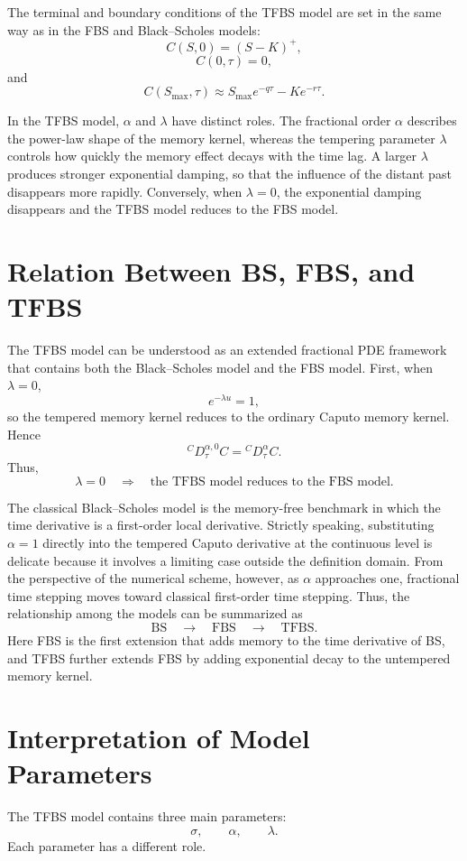 \documentclass[11pt,a4paper]{report}
\begin{document}
The terminal and boundary conditions of the TFBS model are set in the same way as in the FBS and Black--Scholes models:
\[
C(S,0)
=
(S-K)^+,
\]
\[
C(0,\tau)=0,
\]
and
\[
C(S_{\max},\tau)
\approx
S_{\max}e^{-q\tau}
-
Ke^{-r\tau}.
\]

In the TFBS model, $\alpha$ and $\lambda$ have distinct roles. The fractional order $\alpha$ describes the power-law shape of the memory kernel, whereas the tempering parameter $\lambda$ controls how quickly the memory effect decays with the time lag. A larger $\lambda$ produces stronger exponential damping, so that the influence of the distant past disappears more rapidly. Conversely, when $\lambda=0$, the exponential damping disappears and the TFBS model reduces to the FBS model.

\section{Relation Between BS, FBS, and TFBS}

The TFBS model can be understood as an extended fractional PDE framework that contains both the Black--Scholes model and the FBS model. First, when $\lambda=0$,
\[
e^{-\lambda u}=1,
\]
so the tempered memory kernel reduces to the ordinary Caputo memory kernel. Hence
\[
{}^C D_\tau^{\alpha,0}C
=
{}^C D_\tau^\alpha C.
\]
Thus,
\[
\lambda=0
\quad\Longrightarrow\quad
\text{the TFBS model reduces to the FBS model.}
\]

The classical Black--Scholes model is the memory-free benchmark in which the time derivative is a first-order local derivative. Strictly speaking, substituting $\alpha=1$ directly into the tempered Caputo derivative at the continuous level is delicate because it involves a limiting case outside the definition domain. From the perspective of the numerical scheme, however, as $\alpha$ approaches one, fractional time stepping moves toward classical first-order time stepping. Thus, the relationship among the models can be summarized as
\[
\text{BS}
\quad\longrightarrow\quad
\text{FBS}
\quad\longrightarrow\quad
\text{TFBS}.
\]
Here FBS is the first extension that adds memory to the time derivative of BS, and TFBS further extends FBS by adding exponential decay to the untempered memory kernel.

\section{Interpretation of Model Parameters}

The TFBS model contains three main parameters:
\[
\sigma,
\qquad
\alpha,
\qquad
\lambda.
\]
Each parameter has a different role.
\end{document}
